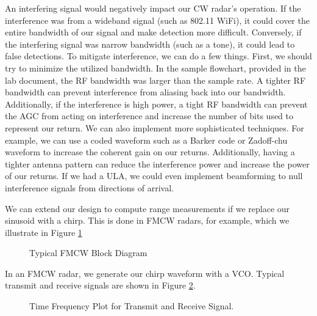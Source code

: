 \documentclass{article}
\begin{document}
An interfering signal would negatively impact our CW radar's operation. If the interference was from a wideband signal (such as 802.11 WiFi), it could cover the entire bandwidth of our signal and make detection more difficult. Conversely, if the interfering signal was narrow bandwidth (such as a tone), it could lead to false detections. To mitigate interference, we can do a few things. First, we should try to minimize the utilized bandwidth. In the sample flowchart, provided in the lab document, the RF bandwidth was larger than the sample rate. A tighter RF bandwidth can prevent interference from aliasing back into our bandwidth. Additionally, if the interference is high power, a tight RF bandwidth can prevent the AGC from acting on interference and increase the number of bits used to represent our return. We can also implement more sophisticated techniques. For example, we can use a coded waveform such as a Barker code or Zadoff-chu waveform to increase the coherent gain on our returns. Additionally, having a tighter antenna pattern can reduce the interference power and increase the power of our returns. If we had a ULA, we could even implement beamforming to null interference signals from directions of arrival.

We can extend our design to compute range measurements if we replace our sinusoid with a chirp. This is done in FMCW radars, for example, which we illustrate in Figure \ref{fig::fmcw_radar}

\begin{figure}[H]
    	\centering
    	\caption{Typical FMCW Block Diagram \cite{9613183}}
    	\label{fig::fmcw_radar}
\end{figure}
	
\noindent In an FMCW radar, we generate our chirp waveform with a VCO.  Typical transmit and receive signals are shown in Figure \ref{fig::fmcw_spectrogram}.

\begin{figure}[H]
    	\centering
    	\caption{Time Frequency Plot for Transmit and Receive Signal.\cite{Long2019AssistingTV}}
    	\label{fig::fmcw_spectrogram}
\end{figure}
\end{document}
